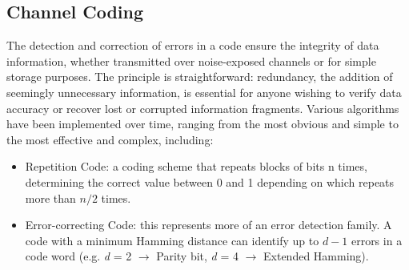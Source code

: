 \subsection{Channel Coding}
The detection and correction of errors in a code ensure the integrity of data information, whether transmitted over noise-exposed channels or for simple storage purposes. The principle is straightforward: redundancy, the addition of seemingly unnecessary information, is essential for anyone wishing to verify data accuracy or recover lost or corrupted information fragments. Various algorithms have been implemented over time, ranging from the most obvious and simple to the most effective and complex, including:\begin{itemize}                                                                                                                                                                                                                                                                                                                                                                                                                                                                                                                                   \item Repetition Code: a coding scheme that repeats blocks of bits n times, determining the correct value between 0 and 1 depending on which repeats more than $n/2$ times.                                                                                                                                                                                                                                                  \item Error-correcting Code: this represents more of an error detection family. A code with a minimum Hamming distance can identify up to $d - 1$ errors in a code word (e.g. \textit{d} = 2 $\rightarrow$ Parity bit, \textit{d} = 4 $\rightarrow$ Extended Hamming).                                                                                                                                                                                                     \end{itemize}

